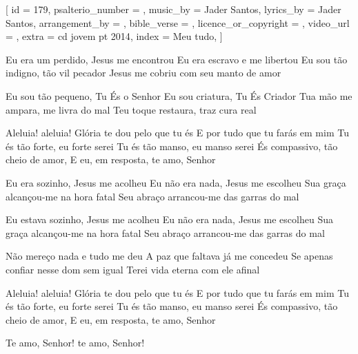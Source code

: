 [
    id                     = {179},
    psalterio_number       = {},
    music_by               = {Jader Santos},
    lyrics_by              = {Jader Santos},
    arrangement_by         = {},
    bible_verse            = {},
    licence_or_copyright   = {},
    video_url              = {},
    extra                  = {cd jovem pt 2014},
    index                  = {Meu tudo},
]

\beginverse
Eu era um perdido, Jesus me encontrou
Eu era escravo e me libertou
Eu sou tão indigno, tão vil pecador
Jesus me cobriu com seu manto de amor
\endverse

\beginverse
Eu sou tão pequeno, Tu És o Senhor
Eu sou criatura, Tu És Criador
Tua mão me ampara, me livra do mal
Teu toque restaura, traz cura real
\endverse

\beginchorus
Aleluia! aleluia!
Glória te dou pelo que tu és
E por tudo que tu farás em mim
Tu és tão forte, eu forte serei
Tu és tão manso, eu manso serei
És compassivo, tão cheio de amor,
E eu, em resposta, te amo, Senhor
\endchorus

\beginverse
Eu era sozinho, Jesus me acolheu
Eu não era nada, Jesus me escolheu
Sua graça alcançou-me na hora fatal
Seu abraço arrancou-me das garras do mal
\endverse

\beginverse
Eu estava sozinho, Jesus me acolheu
Eu não era nada, Jesus me escolheu
Sua graça alcançou-me na hora fatal
Seu abraço arrancou-me das garras do mal
\endverse

\beginverse
Não mereço nada e tudo me deu
A paz que faltava já me concedeu
Se apenas confiar nesse dom sem igual
Terei vida eterna com ele afinal
\endverse

\beginchorus
Aleluia! aleluia!
Glória te dou pelo que tu és
E por tudo que tu farás em mim
Tu és tão forte, eu forte serei
Tu és tão manso, eu manso serei
És compassivo, tão cheio de amor,
E eu, em resposta, te amo, Senhor

Te amo, Senhor! te amo, Senhor!
\endchorus



\endsong

